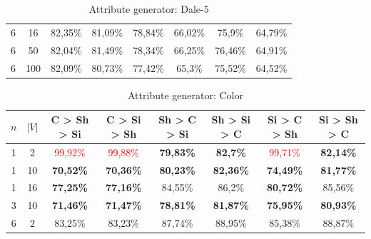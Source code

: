 \begin{table}[ht]
\begin{tabular}{cc|c|c|c|c|c|c}
        {6} & {16}  & {82,35\%}                & {81,09\%}                & {78,84\%}                & {66,02\%}                & {75,9\%}                 & {64,79\%}                \\
        {6} & {50}  & {82,04\%}                & {81,49\%}                & {78,34\%}                & {66,25\%}                & {76,46\%}                & {64,91\%}                \\
        {6} & {100} & {82,09\%}                & {80,73\%}                & {77,42\%}                & {65,3\%}                 & {75,52\%}                & {64,52\%}                \\
        \bottomrule
    \end{tabular}
    \caption{Attribute generator: Dale-5}
    \label{tab:probing:attribute-generator:dale-5}
\end{table}

\begin{table}[ht]
    \centering
    \begin{tabular}{cc|c|c|c|c|c|c}
        \toprule
        $n$ & $|V|$ & \textbf{C > Sh > Si}     & \textbf{C > Si > Sh}     & \textbf{Sh > C > Si} & \textbf{Sh > Si > C} & \textbf{Si > C > Sh}     & \textbf{Si > Sh > C} \\\midrule
        {1} & {2}   & \textcolor{red}{99,92\%} & \textcolor{red}{99,88\%} & \textbf{79,83\%}     & \textbf{82,7\%}      & \textcolor{red}{99,71\%} & \textbf{82,14\%}     \\
        {1} & {10}  & \textbf{70,52\%}         & \textbf{70,36\%}         & \textbf{80,23\%}     & \textbf{82,36\%}     & \textbf{74,49\%}         & \textbf{81,77\%}     \\
        {1} & {16}  & \textbf{77,25\%}         & \textbf{77,16\%}         & {84,55\%}            & {86,2\%}             & \textbf{80,72\%}         & {85,56\%}            \\
        {3} & {10}  & \textbf{71,46\%}         & \textbf{71,47\%}         & \textbf{78,81\%}     & \textbf{81,87\%}     & \textbf{75,95\%}         & \textbf{80,93\%}     \\
        {6} & {2}   & {83,25\%}                & {83,23\%}                & {87,74\%}            & {88,95\%}            & {85,38\%}                & {88,87\%}            \\
        \bottomrule
    \end{tabular}
    \caption{Attribute generator: Color}
    \label{tab:probing:attribute-generator:colour}
\end{table}


